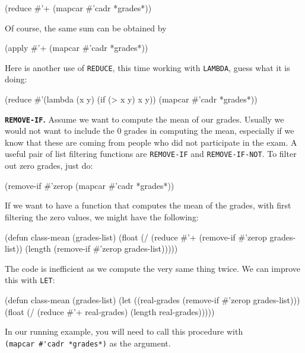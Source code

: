 \documentclass[a4paper,11pt]{article}
\begin{document}
\begin{uenum}
\begin{lispcode}
(reduce #'+ (mapcar #'cadr *grades*))
\end{lispcode}

Of course, the same sum can be obtained by

\begin{lispcode}
(apply #'+ (mapcar #'cadr *grades*))
\end{lispcode}

Here is another use of \Verb+REDUCE+, this time working with \Verb+LAMBDA+, guess what it is doing:

\begin{lispcode}
(reduce
     #'(lambda (x y) (if (> x y) x y))
	 (mapcar #'cadr *grades*))
\end{lispcode}

\item {\bf \Verb+REMOVE-IF+.} Assume we want to compute the mean of our grades. Usually we would not want to include the 0 grades in computing the mean, especially if we know that these are coming from people who did not participate in the exam. A useful pair of list filtering functions are \Verb+REMOVE-IF+ and \Verb+REMOVE-IF-NOT+. To filter out zero grades, just do:  

\begin{lispcode}
(remove-if #'zerop (mapcar #'cadr *grades*))
\end{lispcode}

If we want to have a function that computes the mean of the grades, with first filtering the zero values, we might have the following:

\begin{lispcode}
(defun class-mean (grades-list)
  (float (/
		   (reduce #'+ (remove-if #'zerop grades-list)) 
		   (length (remove-if #'zerop grades-list)))))
\end{lispcode}

The code is inefficient as we compute the very same thing twice. We can improve this with \Verb+LET+:

\begin{lispcode}
(defun class-mean (grades-list)
  (let ((real-grades (remove-if #'zerop grades-list))) 
	(float (/
			(reduce #'+ real-grades) 
			(length real-grades)))))
\end{lispcode}

In our running example, you will need to call this procedure with\\ \Verb+(mapcar #'cadr *grades*)+ as the argument.


\end{uenum}
\end{document}
